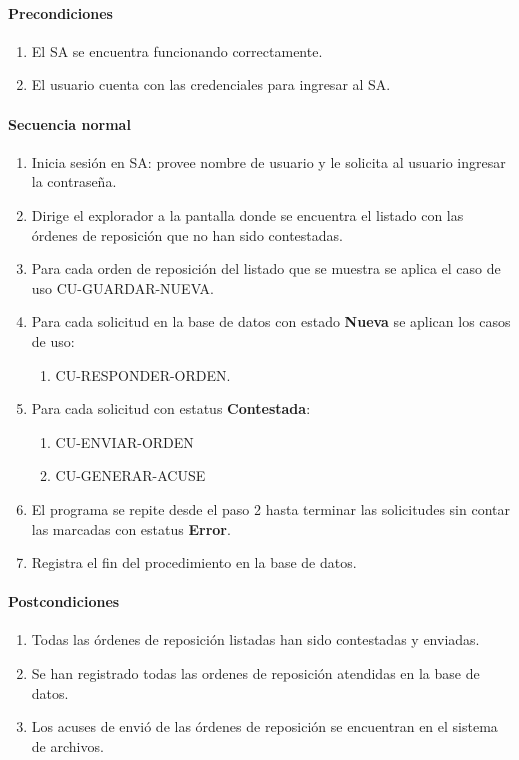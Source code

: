 \paragraph*{Precondiciones}
\begin{enumerate}
  \item El SA se encuentra funcionando correctamente.
  \item El usuario cuenta con las credenciales para ingresar al SA.
\end{enumerate}
\paragraph*{Secuencia normal}
\begin{enumerate}
  \item Inicia sesión en SA: provee nombre de usuario y le solicita al usuario ingresar la contraseña.
  \item Dirige el explorador a la pantalla donde se encuentra el listado con las órdenes de reposición que no han sido contestadas.
  \item Para cada orden de reposición del listado que se muestra se aplica el caso de uso CU-GUARDAR-NUEVA.
  \item Para cada solicitud en la base de datos con estado \textbf{Nueva} se aplican los casos de uso:
  \begin{enumerate}
    \item CU-RESPONDER-ORDEN.
  \end{enumerate}
  \item Para cada solicitud con estatus \textbf{Contestada}:
  \begin{enumerate}
    \item CU-ENVIAR-ORDEN
    \item CU-GENERAR-ACUSE
  \end{enumerate}
  \item El programa se repite desde el paso 2 hasta terminar las solicitudes sin contar las marcadas con estatus \textbf{Error}.
  \item Registra el fin del procedimiento en la base de datos.
\end{enumerate}
\paragraph*{Postcondiciones}
\begin{enumerate}
  \item Todas las órdenes de reposición listadas han sido contestadas y enviadas.
  \item Se han registrado todas las ordenes de reposición atendidas en la base de datos.
  \item Los acuses de envió de las órdenes de reposición se encuentran en el sistema de archivos.
\end{enumerate}

